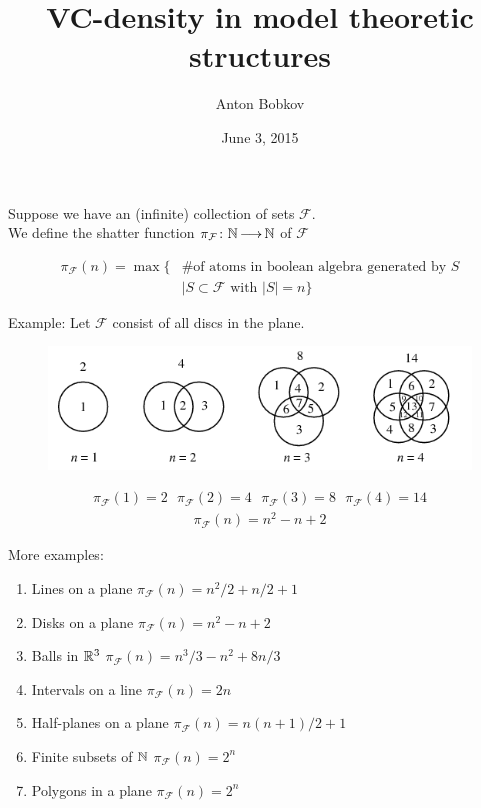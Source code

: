 \documentclass{beamer}
\title{VC-density in model theoretic structures}
\author{Anton Bobkov}
\date{June 3, 2015}
\newcommand{\F}{\mathcal F}
\begin{document}
\maketitle

\begin{frame}
	Suppose we have an (infinite) collection of sets $\F$. \\
	We define the shatter function $\pi_\F \colon \N \arr \N$ of $\F$

	\begin{align*}
		\pi_\F(n) = \max \{ &\text {\# of atoms in boolean algebra generated by $S$} \\
		            &\mid S \subset \F \text{ with } |S| = n\}
	\end{align*}
\end{frame}

\begin{frame}
	Example: Let $\F$ consist of all discs in the plane.
	\begin{figure}[p]
    \centering
    \includegraphics[scale=0.75]{circle.png}
	\end{figure}
	\begin{align*}
		\pi_\F(1) = 2 \ \ \  \pi_\F(2) = 4 \ \ \  \pi_\F(3) = 8  \ \ \ \pi_\F(4) = 14
	\end{align*}
	\begin{align*}
		\pi_\F(n) = n^2 - n + 2
	\end{align*}
\end{frame}

\begin{frame}
More examples: \\
	\begin{enumerate}
		\item Lines on a plane $\pi_\F(n) = n^2/2 + n/2 + 1$
		\item Disks on a plane	$\pi_\F(n) = n^2 - n + 2$
		\item Balls in $\mathbb{R}^3$  $\pi_\F(n) = n^3/3 - n^2 + 8n/3$
		\item Intervals on a line $\pi_\F(n) = 2n$
		\item Half-planes on a plane $\pi_\F(n) = n(n+1)/2 + 1$
		\item Finite subsets of $\mathbb{N}$ $\pi_\F(n) = 2^n$
		\item Polygons in a plane $\pi_\F(n) = 2^n$
	\end{enumerate}
\end{frame}
\end{document}

